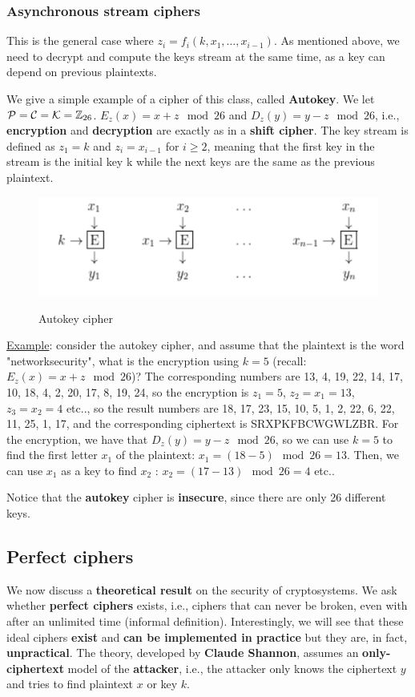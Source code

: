 \subsubsection{Asynchronous stream ciphers}
This is the general case where $z_i = f_i(k,x_1,\ldots,x_{i-1})$. As mentioned above, we need to decrypt and compute the keys stream at the same time, as a key can depend on previous plaintexts. 

We give a simple example of a cipher of this class, called \textbf{Autokey}. We let ${\cal P}={\cal C}={\cal K}=\mathbb{Z}_{26}$. $E_z(x) = x+z \mod 26$ and $D_z(y) = y-z \mod 26$, i.e., \textbf{encryption} and \textbf{decryption} are exactly as in a \textbf{shift cipher}. The key stream is defined as $z_1 = k$ and $z_i = x_{i-1}$ for $i\geq 2$, meaning that the first key in the stream is the initial key k while the next keys are the same as the previous plaintext.

\begin{figure}[h!]
        \centering
        \includegraphics[scale = 1.0]{img/stream4.png}
        \label{stream4}
        \caption{Autokey cipher}
\end{figure}

\underline{Example}: consider the autokey cipher, and assume that the plaintext is the word "networksecurity", what is the encryption using $k = 5$ (recall: $E_z(x) = x+z \mod 26$)? The corresponding numbers are 13, 4, 19, 22, 14, 17, 10, 18, 4, 2, 20, 17, 8, 19, 24, so the encryption is $z_1 = 5$, $z_2 = x_1 = 13$, $z_3 = x_2 = 4$ etc.., so the result numbers are 18, 17, 23, 15, 10, 5, 1, 2, 22, 6, 22, 11, 25, 1, 17, and the corresponding ciphertext is SRXPKFBCWGWLZBR. For the encryption, we have that $D_z(y) = y-z \mod 26$, so we can use $k = 5$ to find the first letter $x_1$ of the plaintext: $x_1 = (18-5) \mod 26 = 13$. Then, we can use $x_1$ as a key to find $x_2$ : $x_2 = (17-13) \mod 26 = 4$ etc..

Notice that the \textbf{autokey} cipher is \textbf{insecure}, since there are only 26 different keys.

\subsection{Perfect ciphers}
We now discuss a \textbf{theoretical result} on the security of cryptosystems. We ask whether \textbf{perfect ciphers} exists, i.e., ciphers that can never be broken, even with after an unlimited time (informal definition). Interestingly, we will see that these ideal ciphers \textbf{exist} and \textbf{can be implemented in practice} but they are, in fact, \textbf{unpractical}. The theory, developed by \textbf{Claude Shannon}, assumes an \textbf{only-ciphertext} model of the \textbf{attacker}, i.e., the attacker only knows the ciphertext $y$ and tries to find plaintext $x$ or key $k$.

